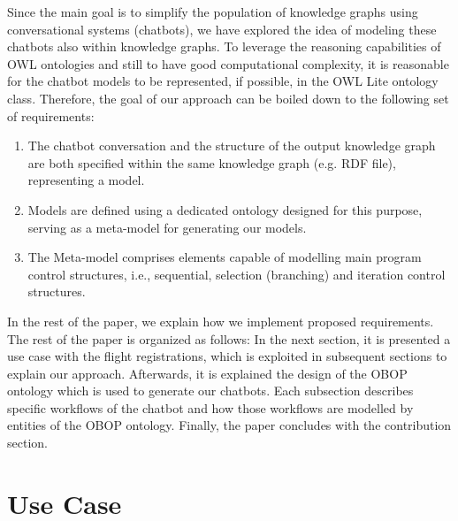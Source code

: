 \documentclass[runningheads]{llncs}
\begin{document}
Since the main goal is to simplify the population of knowledge graphs using conversational systems (chatbots), we have explored the idea of modeling these chatbots also within knowledge graphs. To leverage the reasoning capabilities of OWL ontologies and still to have good computational complexity, it is reasonable for the chatbot models to be represented, if possible, in the OWL Lite ontology class. Therefore, the goal of our approach can be boiled down to the following set of requirements:
\begin{enumerate}
\item
  The chatbot conversation and the structure of the output knowledge graph are both specified within the same knowledge graph (e.g. RDF file), representing a model.
\item
  Models are defined using a dedicated ontology designed for this purpose, serving as a meta-model for generating our models.
\item
The Meta-model comprises elements capable of modelling main program control structures, i.e., sequential, selection (branching) and iteration control structures. 
\end{enumerate}

In the rest of the paper, we explain how we implement proposed requirements.
The rest of the paper is organized as follows: In the next section, it is presented a use case with the flight registrations, which is exploited in subsequent sections to explain our approach. Afterwards, it is explained the design of the OBOP ontology which is used to generate our chatbots. Each subsection describes specific workflows of the chatbot and how those workflows are modelled by entities of the OBOP ontology. Finally, the paper concludes with the contribution section.

\section{Use Case}
\end{document}

